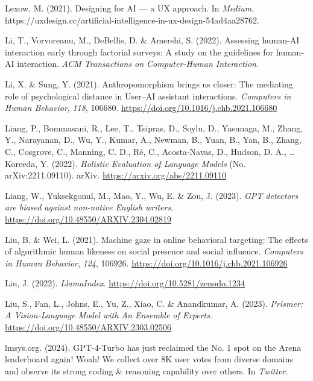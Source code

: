 \documentclass[
  letterpaper,
  DIV=11,
  numbers=noendperiod]{scrartcl}
\newlength{\cslhangindent}
\newenvironment{CSLReferences}[2] %
 {\begin{list}{}{%
  \setlength{\itemindent}{0pt}
  \setlength{\leftmargin}{0pt}
  \setlength{\parsep}{0pt}
  \ifodd #1
   \setlength{\leftmargin}{\cslhangindent}
   \setlength{\itemindent}{-1\cslhangindent}
  \fi
  \setlength{\itemsep}{#2\baselineskip}}}
 {\end{list}}
\begin{document}
\begin{CSLReferences}{1}{0}
Lexow, M. (2021). Designing for {AI} --- a {UX} approach. In
\emph{Medium}.
https://uxdesign.cc/artificial-intelligence-in-ux-design-54ad4aa28762.

Li, T., Vorvoreanu, M., DeBellis, D. \& Amershi, S. (2022). Assessing
human-{AI} interaction early through factorial surveys: {A} study on the
guidelines for human-{AI} interaction. \emph{ACM Transactions on
Computer-Human Interaction}.

Li, X. \& Sung, Y. (2021). Anthropomorphism brings us closer: {The}
mediating role of psychological distance in {User}--{AI} assistant
interactions. \emph{Computers in Human Behavior}, \emph{118}, 106680.
\url{https://doi.org/10.1016/j.chb.2021.106680}

Liang, P., Bommasani, R., Lee, T., Tsipras, D., Soylu, D., Yasunaga, M.,
Zhang, Y., Narayanan, D., Wu, Y., Kumar, A., Newman, B., Yuan, B., Yan,
B., Zhang, C., Cosgrove, C., Manning, C. D., Ré, C., Acosta-Navas, D.,
Hudson, D. A., \ldots{} Koreeda, Y. (2022). \emph{Holistic {Evaluation}
of {Language Models}} (No. arXiv:2211.09110). arXiv.
\url{https://arxiv.org/abs/2211.09110}

Liang, W., Yuksekgonul, M., Mao, Y., Wu, E. \& Zou, J. (2023).
\emph{{GPT} detectors are biased against non-native {English} writers}.
\url{https://doi.org/10.48550/ARXIV.2304.02819}

Liu, B. \& Wei, L. (2021). Machine gaze in online behavioral targeting:
{The} effects of algorithmic human likeness on social presence and
social influence. \emph{Computers in Human Behavior}, \emph{124},
106926. \url{https://doi.org/10.1016/j.chb.2021.106926}

Liu, J. (2022). \emph{{LlamaIndex}}.
\url{https://doi.org/10.5281/zenodo.1234}

Liu, S., Fan, L., Johns, E., Yu, Z., Xiao, C. \& Anandkumar, A. (2023).
\emph{Prismer: {A Vision-Language Model} with {An Ensemble} of
{Experts}}. \url{https://doi.org/10.48550/ARXIV.2303.02506}

lmsys.org. (2024). {GPT-4-Turbo} has just reclaimed the {No}. 1 spot on
the {Arena} leaderboard again! {Woah}! {We} collect over {8K} user votes
from diverse domains and observe its strong coding \& reasoning
capability over others. In \emph{Twitter}.


\end{CSLReferences}
\end{document}
